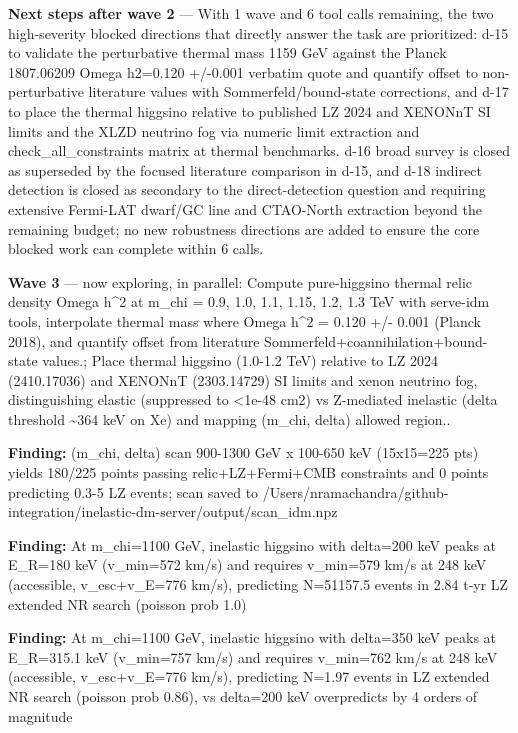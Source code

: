 \documentclass[11pt,a4paper]{article}
\begin{document}
\textbf{Next steps after wave 2} --- With 1 wave and 6 tool calls remaining, the two high-severity blocked directions that directly answer the task are prioritized: d-15 to validate the perturbative thermal mass 1159 GeV against the Planck 1807.06209 Omega h2=0.120 +/-0.001 verbatim quote and quantify offset to non-perturbative literature values with Sommerfeld/bound-state corrections, and d-17 to place the thermal higgsino relative to published LZ 2024 and XENONnT SI limits and the XLZD neutrino fog via numeric limit extraction and check\_all\_constraints matrix at thermal benchmarks. d-16 broad survey is closed as superseded by the focused literature comparison in d-15, and d-18 indirect detection is closed as secondary to the direct-detection question and requiring extensive Fermi-LAT dwarf/GC line and CTAO-North extraction beyond the remaining budget; no new robustness directions are added to ensure the core blocked work can complete within 6 calls.

\textbf{Wave 3} --- now exploring, in parallel: Compute pure-higgsino thermal relic density Omega h\textasciicircum{}2 at m\_chi = 0.9, 1.0, 1.1, 1.15, 1.2, 1.3 TeV with serve-idm tools, interpolate thermal mass where Omega h\textasciicircum{}2 = 0.120 +/- 0.001 (Planck 2018), and quantify offset from literature Sommerfeld+coannihilation+bound-state values.; Place thermal higgsino (1.0-1.2 TeV) relative to LZ 2024 (2410.17036) and XENONnT (2303.14729) SI limits and xenon neutrino fog, distinguishing elastic (suppressed to \textless{}1e-48 cm2) vs Z-mediated inelastic (delta threshold \textasciitilde{}364 keV on Xe) and mapping (m\_chi, delta) allowed region..

\textbf{Finding:} (m\_chi, delta) scan 900-1300 GeV x 100-650 keV (15x15=225 pts) yields 180/225 points passing relic+LZ+Fermi+CMB constraints and 0 points predicting 0.3-5 LZ events; scan saved to /Users/nramachandra/github-integration/inelastic-dm-server/output/scan\_idm.npz

\textbf{Finding:} At m\_chi=1100 GeV, inelastic higgsino with delta=200 keV peaks at E\_R=180 keV (v\_min=572 km/s) and requires v\_min=579 km/s at 248 keV (accessible, v\_esc+v\_E=776 km/s), predicting N=51157.5 events in 2.84 t-yr LZ extended NR search (poisson prob 1.0)

\textbf{Finding:} At m\_chi=1100 GeV, inelastic higgsino with delta=350 keV peaks at E\_R=315.1 keV (v\_min=757 km/s) and requires v\_min=762 km/s at 248 keV (accessible, v\_esc+v\_E=776 km/s), predicting N=1.97 events in LZ extended NR search (poisson prob 0.86), vs delta=200 keV overpredicts by 4 orders of magnitude
\end{document}
